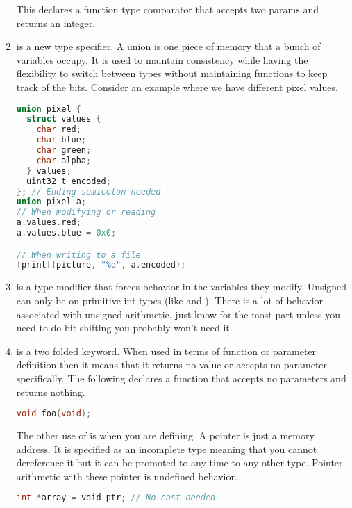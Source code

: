 \begin{enumerate}
	      This declares a function type comparator that accepts two  params and returns an integer.

	    \item {} is a new type specifier.
        A union is one piece of memory that a bunch of variables occupy.
        It is used to maintain consistency while having the flexibility to switch between types without maintaining functions to keep track of the bits.
        Consider an example where we have different pixel values.
	      \begin{lstlisting}[language=C]
union pixel {
  struct values {
    char red;
    char blue;
    char green;
    char alpha;
  } values;
  uint32_t encoded;
}; // Ending semicolon needed
union pixel a;
// When modifying or reading
a.values.red;
a.values.blue = 0x0;

// When writing to a file
fprintf(picture, "%d", a.encoded);
\end{lstlisting}

	    \item {} is a type modifier that forces  behavior in the variables they modify.
        Unsigned can only be on primitive int types (like  and ).
        There is a lot of behavior associated with unsigned arithmetic, just know for the most part unless you need to do bit shifting you probably won't need it.

	    \item {} is a two folded keyword.
        When used in terms of function or parameter definition then it means that it returns no value or accepts no parameter specifically. The following declares a function that accepts no parameters and returns nothing.

	      \begin{lstlisting}[language=C]
void foo(void);
\end{lstlisting}


	      The other use of  is when you are defining.
        A  pointer is just a memory address. It is specified as an incomplete type meaning that you cannot dereference it but it can be promoted to any time to any other type. Pointer arithmetic with these pointer is undefined behavior.

	      \begin{lstlisting}[language=C]
int *array = void_ptr; // No cast needed
\end{lstlisting}


\end{enumerate}
